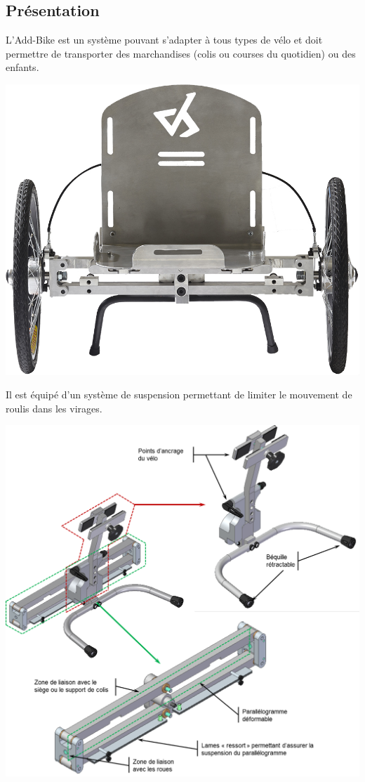 \documentclass[10pt,fleqn]{article} %
\begin{document}
\def\pathfig{images}

\vspace{4.5cm}
\pagestyle{fancy}
\thispagestyle{plain}

\def\columnseprulecolor{\color{ocre}}
\setlength{\columnseprule}{0.4pt} 

\def\pathfig{images}

\begin{multicols}{2}

\subsection*{Présentation}
L'Add-Bike est un système pouvant s’adapter à tous types de vélo et doit permettre de transporter des marchandises (colis ou courses du quotidien) ou des enfants.
\begin{center}
\includegraphics[width=.4\linewidth]{images/add_02.png}
\end{center}
Il est équipé d'un système de suspension permettant de limiter le mouvement de roulis dans les virages. 

\begin{center}
\includegraphics[width=\linewidth]{images/add_04.png}
\end{center}


\end{multicols}
\end{document}
